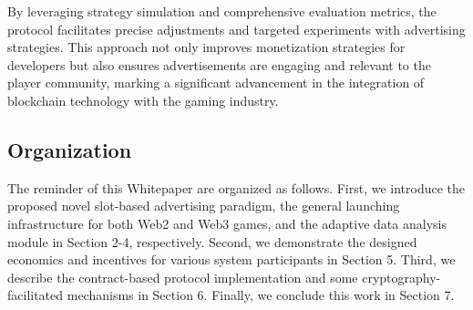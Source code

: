 By leveraging strategy simulation and comprehensive evaluation metrics, the protocol facilitates precise adjustments and targeted experiments with advertising strategies. This approach not only improves monetization strategies for developers but also ensures advertisements are engaging and relevant to the player community, marking a significant advancement in the integration of blockchain technology with the gaming industry.


\subsection{Organization}
The reminder of this Whitepaper are organized as follows. First, we introduce the proposed novel slot-based advertising paradigm, the general launching infrastructure for both Web2 and Web3 games, and the adaptive data analysis module in Section 2-4, respectively. Second, we demonstrate the designed economics and incentives for various system participants in Section 5. Third, we describe the contract-based protocol implementation and some cryptography-facilitated mechanisms in Section 6. Finally, we conclude this work in Section 7.